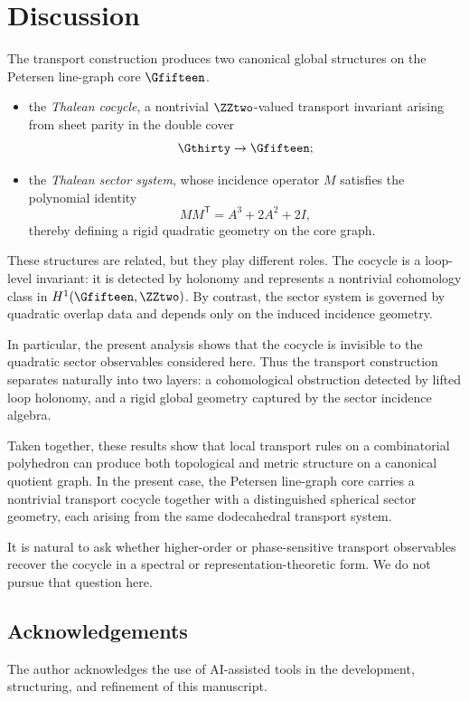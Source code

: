 \section{Discussion}

The transport construction produces two canonical global structures on the
Petersen line-graph core $\Gfifteen$.

\begin{itemize}
\item the \emph{Thalean cocycle}, a nontrivial $\ZZtwo$-valued transport
invariant arising from sheet parity in the double cover
\[
\Gthirty \to \Gfifteen;
\]

\item the \emph{Thalean sector system}, whose incidence operator $M$
satisfies the polynomial identity
\[
M M^{\mathsf T} = A^3 + 2A^2 + 2I,
\]
thereby defining a rigid quadratic geometry on the core graph.
\end{itemize}

These structures are related, but they play different roles. The cocycle
is a loop-level invariant: it is detected by holonomy and represents a
nontrivial cohomology class in $H^1(\Gfifteen,\ZZtwo)$. By contrast, the
sector system is governed by quadratic overlap data and depends only on
the induced incidence geometry.

In particular, the present analysis shows that the cocycle is invisible
to the quadratic sector observables considered here. Thus the transport
construction separates naturally into two layers: a cohomological
obstruction detected by lifted loop holonomy, and a rigid global geometry
captured by the sector incidence algebra.

Taken together, these results show that local transport rules on a
combinatorial polyhedron can produce both topological and metric
structure on a canonical quotient graph. In the present case, the
Petersen line-graph core carries a nontrivial transport cocycle together
with a distinguished spherical sector geometry, each arising from the
same dodecahedral transport system.

It is natural to ask whether higher-order or phase-sensitive transport
observables recover the cocycle in a spectral or representation-theoretic
form. We do not pursue that question here.

\subsection*{Acknowledgements}

The author acknowledges the use of AI-assisted tools in the development,
structuring, and refinement of this manuscript.
